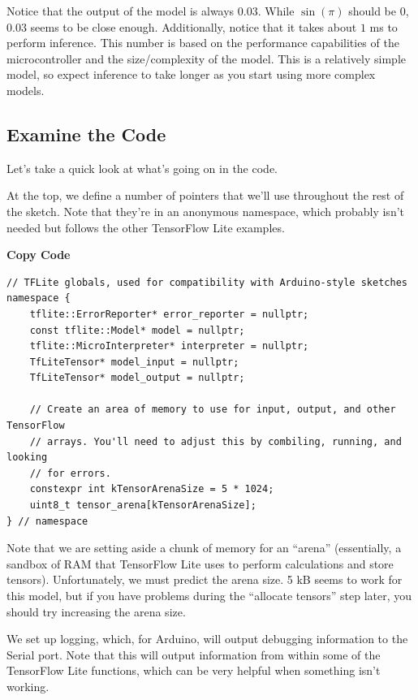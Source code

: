 Notice that the output of the model is always $0.03$. While $\sin(\pi)$ should be $0$, $0.03$ seems to be close enough. Additionally, notice that it takes about $1$ ms to perform inference. This number is based on the performance capabilities of the microcontroller and the size/complexity of the model. This is a relatively simple model, so expect inference to take longer as you start using more complex models.

\subsection{Examine the Code}

Let's take a quick look at what's going on in the code.

At the top, we define a number of pointers that we'll use throughout the rest of the sketch. Note that they're in an anonymous namespace, which probably isn't needed but follows the other TensorFlow Lite examples.



\medskip

 \textbf{Copy Code}
 
 \begin{lstlisting}
// TFLite globals, used for compatibility with Arduino-style sketches
namespace {
    tflite::ErrorReporter* error_reporter = nullptr;
    const tflite::Model* model = nullptr;
    tflite::MicroInterpreter* interpreter = nullptr;
    TfLiteTensor* model_input = nullptr;
    TfLiteTensor* model_output = nullptr;
    
    // Create an area of memory to use for input, output, and other TensorFlow
    // arrays. You'll need to adjust this by combiling, running, and looking
    // for errors.
    constexpr int kTensorArenaSize = 5 * 1024;
    uint8_t tensor_arena[kTensorArenaSize];
} // namespace
\end{lstlisting}



Note that we are setting aside a chunk of memory for an ``arena'' (essentially, a sandbox of RAM that TensorFlow Lite uses to perform calculations and store tensors). Unfortunately, we must predict the arena size. 5 kB seems to work for this model, but if you have problems during the ``allocate tensors'' step later, you should try increasing the arena size.

We set up logging, which, for Arduino, will output debugging information to the Serial port. Note that this will output information from within some of the TensorFlow Lite functions, which can be very helpful when something isn't working.



